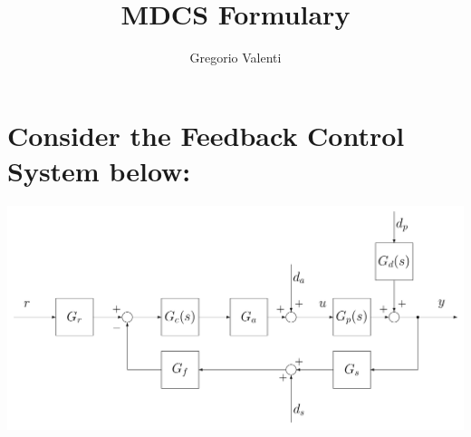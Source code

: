 \documentclass{article}
\title{MDCS Formulary}
\author{Gregorio Valenti}
\date{}
\begin{document}
	
	\section{Consider the Feedback Control System below:}
	\hspace{1cm}
	\includegraphics[scale=0.5]{images/feedback_control_system.png}
	
\end{document}
